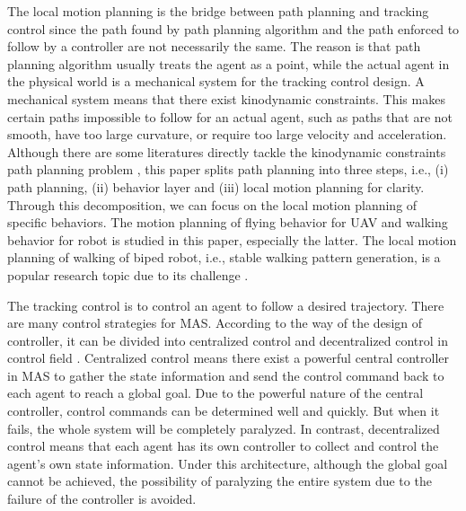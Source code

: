 \documentclass{ieeeaccess}
\begin{document}

The local motion planning is the bridge between path planning and tracking control since the path found by path planning algorithm and the path enforced to follow by a controller are not necessarily the same. The reason is that path planning algorithm usually treats the agent as a point, while the actual agent in the physical world is a mechanical system for the tracking control design. A mechanical system means that there exist kinodynamic constraints. This makes certain paths impossible to follow for an actual agent, such as paths that are not smooth, have too large curvature, or require too large velocity and acceleration. Although there are some literatures directly tackle the kinodynamic constraints path planning problem \cite{9384209}, this paper splits path planning into three steps, i.e., (i) path planning, (ii) behavior layer and (iii) local motion planning for clarity. Through this decomposition, we can focus on the local motion planning of specific behaviors. The motion planning of flying behavior for UAV and walking behavior for robot is studied in this paper, especially the latter. The local motion planning of walking of biped robot, i.e., stable walking pattern generation, is a popular research topic due to its challenge \cite{olcay2017design}.

The tracking control is to control an agent to follow a desired trajectory. There are many control strategies for MAS. According to the way of the design of controller, it can be divided into centralized control and decentralized control in control field \cite{8931370}. Centralized control means there exist a powerful central controller in MAS to gather the state information and send the control command back to each agent to reach a global goal. Due to the powerful nature of the central controller, control commands can be determined well and quickly. But when it fails, the whole system will be completely paralyzed. In contrast, decentralized control means that each agent has its own controller to collect and control the agent's own state information. Under this architecture, although the global goal cannot be achieved, the possibility of paralyzing the entire system due to the failure of the controller is avoided.
\end{document}
